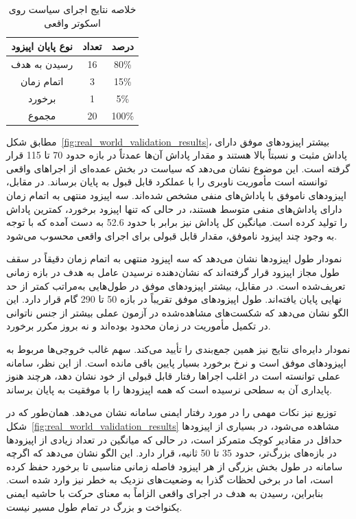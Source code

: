 \begin{table}[htbp]
	\centering
	\caption{خلاصه نتایج اجرای سیاست روی اسکوتر واقعی}
	\label{tab:real_world_validation_summary}
	\renewcommand{\arraystretch}{1.3}
	\begin{tabular}{|c|c|c|}
		\hline
		\textbf{نوع پایان اپیزود} & \textbf{تعداد} & \textbf{درصد} \\
		\hline
		رسیدن به هدف & 16 & 80\% \\
		\hline
		اتمام زمان & 3 & 15\% \\
		\hline
		برخورد & 1 & 5\% \\
		\hline
		مجموع & 20 & 100\% \\
		\hline
	\end{tabular}
\end{table}

مطابق شکل~\ref{fig:real_world_validation_results}، بیشتر اپیزودهای موفق دارای پاداش مثبت و نسبتاً بالا هستند و مقدار پاداش آن‌ها عمدتاً در بازه حدود 70 تا 115 قرار گرفته است. این موضوع نشان می‌دهد که سیاست در بخش عمده‌ای از اجراهای واقعی توانسته است مأموریت ناوبری را با عملکرد قابل قبول به پایان برساند. در مقابل، اپیزودهای ناموفق با پاداش‌های منفی مشخص شده‌اند. سه اپیزود منتهی به اتمام زمان دارای پاداش‌های منفی متوسط هستند، در حالی که تنها اپیزود برخورد، کمترین پاداش را تولید کرده است. میانگین کل پاداش نیز برابر با حدود 52.6 به دست آمده که با توجه به وجود چند اپیزود ناموفق، مقدار قابل قبولی برای اجرای واقعی محسوب می‌شود.

نمودار طول اپیزودها نشان می‌دهد که سه اپیزود منتهی به اتمام زمان دقیقاً در سقف طول مجاز اپیزود قرار گرفته‌اند که نشان‌دهنده نرسیدن عامل به هدف در بازه زمانی تعریف‌شده است. در مقابل، بیشتر اپیزودهای موفق در طول‌هایی به‌مراتب کمتر از حد نهایی پایان یافته‌اند. طول اپیزودهای موفق تقریباً در بازه 50 تا 290 گام قرار دارد. این الگو نشان می‌دهد که شکست‌های مشاهده‌شده در آزمون عملی بیشتر از جنس ناتوانی در تکمیل مأموریت در زمان محدود بوده‌اند و نه بروز مکرر برخورد.

نمودار دایره‌ای نتایج نیز همین جمع‌بندی را تأیید می‌کند. سهم غالب خروجی‌ها مربوط به اپیزودهای موفق است و نرخ برخورد بسیار پایین باقی مانده است. از این نظر، سامانه عملی توانسته است در اغلب اجراها رفتار قابل قبولی از خود نشان دهد، هرچند هنوز پایداری آن به سطحی نرسیده است که همه اپیزودها را با موفقیت به پایان برساند.

توزیع  نیز نکات مهمی را در مورد رفتار ایمنی سامانه نشان می‌دهد. همان‌طور که در شکل~\ref{fig:real_world_validation_results} مشاهده می‌شود، در بسیاری از اپیزودها حداقل  در مقادیر کوچک متمرکز است، در حالی که میانگین  در تعداد زیادی از اپیزودها در بازه‌های بزرگ‌تر، حدود 35 تا 50 ثانیه، قرار دارد. این الگو نشان می‌دهد که اگرچه سامانه در طول بخش بزرگی از هر اپیزود فاصله زمانی مناسبی تا برخورد حفظ کرده است، اما در برخی لحظات گذرا به وضعیت‌های نزدیک به خطر نیز وارد شده است. بنابراین، رسیدن به هدف در اجرای واقعی الزاماً به معنای حرکت با حاشیه ایمنی یکنواخت و بزرگ در تمام طول مسیر نیست.

